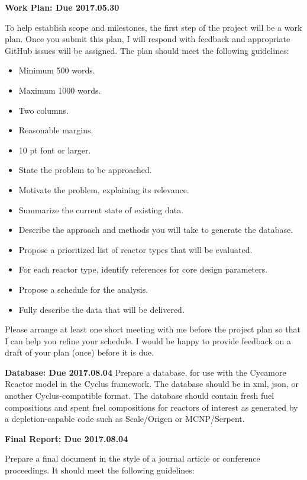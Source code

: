 \documentclass[12pts, answers]{exam}
\newcommand{\duedate}{2017.08.04}
\begin{document}
\begin{questions}
\addpoints
\question[10] \textbf{Work Plan: Due 2017.05.30}

To help establish scope and milestones, the first step of the project will be a 
        work plan. Once you submit this plan, I will respond with feedback and 
        appropriate GitHub issues will be assigned. The plan should meet the 
        following guidelines:

\begin{itemize}
\item Minimum 500 words.
\item Maximum 1000 words.
\item Two columns.
\item Reasonable margins.
\item 10 pt font or larger.
\item State the problem to be approached.
\item Motivate the problem, explaining its relevance.
\item Summarize the current state of existing data. 
\item Describe the approach and methods you will take to generate the database.
\item Propose a prioritized list of reactor types that will be evaluated. 
\item For each reactor type, identify references for core design parameters.
\item Propose a schedule for the analysis.
\item Fully describe the data that will be delivered.
\end{itemize}

Please arrange at least one short meeting with me before the project plan
so that I can help you refine your schedule. I would be happy to provide feedback 
on a draft of your plan (once) before it is due.


\question[20] \textbf{Database: Due \duedate}
Prepare a database, for use with the Cycamore Reactor model in the Cyclus 
framework. The database should be in xml, json, or another Cyclus-compatible 
format. The database should contain fresh fuel compositions and spent fuel 
compositions for reactors of interest as generated by a depletion-capable code 
such as Scale/Origen or MCNP/Serpent. 

\question[60] \textbf{Final Report: Due \duedate}

Prepare a final document in the style of a journal article or conference 
proceedings. It should meet the following guidelines:


\end{questions}
\end{document}
